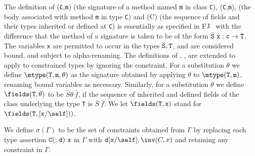 The definition of {\mtype({\tt C},{\tt m})} (the signature of a method
named {\tt m} in class {\tt C}), {\mbody({\tt C},{\tt m})}, (the body
associated with method {\tt m} in type {\tt C}) and \fields(C) (the
sequence of fields and their types inherited or defined at {\tt C}) is
essentially as specified in FJ~\cite{FJ} with the difference that the
method of a signature is taken to be of the form $\bar{\tt S}\ \bar{\tt
x}: {\tt c} \rightarrow {\tt T}$.  The variables {\tt x} are permitted
to occur in the types $\bar{\tt S},{\tt T}$, and are considered bound,
and subject to alpha-renaming.  The definitions of \mtype, \mbody,
\fields{} are extended to apply to constrained types by ignoring the
constraint.  For a substitution $\theta$ we define $\mtype({\tt
T},{\tt m},\theta)$ as the signature obtained by applying $\theta$ to
$\mtype({\tt T},{\tt m})$, renaming bound variables as necessary.
Similarly, for a substitution $\theta$ we define $\fields({\tt
T},\theta)$ to be $\bar{S}\theta\ \bar{f}$, if the sequence of
inherited and defined fields of the class underlying the type {\tt T}
is $\bar{S}\ \bar{f}$. We let $\fields({\tt T},{\tt x})$ stand for
$\fields({\tt T},[{\tt x}/\self]))$.

We define $\sigma(\Gamma)$ to be the set of
constraints obtained from $\Gamma$ by replacing each type assertion
${\tt C(:d)\ x}$ in $\Gamma$ with ${\tt d}[{\tt x}/\self],\inv(C,x)$
and retaining any constraint in $\Gamma$.

